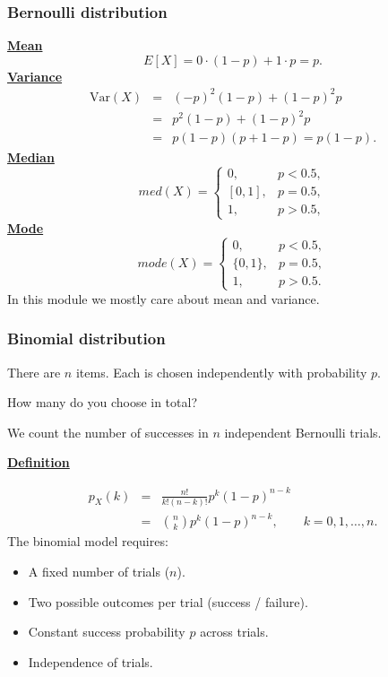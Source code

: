 \documentclass[t,8pt]{beamer}
\begin{document}
\begin{frame}
	\frametitle{Bernoulli distribution}
	{\bf\underline{Mean}}
	\[
	E[X]=0\cdot(1-p)+1\cdot p=p.
	\]
	{\bf\underline{Variance}}
	\begin{eqnarray*}
		\mathrm{Var}(X)
		&=&(-p)^2(1-p)+(1-p)^2p\\
		&=&p^2(1-p)+(1-p)^2p\\
		&=&p(1-p)(p+1-p)
		=p(1-p).
	\end{eqnarray*}
	{\bf\underline{Median}}
	\[
	{med}(X)=
	\left\{\begin{array}{ll}
		0, & p<0.5,\\
		\left[0,1\right], & p=0.5,\\
		1, & p>0.5,
	\end{array}\right.
	\]
	{\bf\underline{Mode}}
	\[
	{mode}(X)=
	\left\{\begin{array}{ll}
		0, & p<0.5,\\
		\{0,1\}, & p=0.5,\\
		1, & p>0.5.
	\end{array}\right.
	\]
	{\small\color{NavyBlue} In this module we mostly care about mean and variance.}
\end{frame}

\begin{frame}
	\frametitle{Binomial distribution}
	There are $n$ items. Each is chosen independently with probability $p$. \par
	How many do you choose in total? \par
	We count the number of successes in $n$ independent Bernoulli trials. \par
	{\bf\underline{Definition}} \par
	\begin{eqnarray*}
		p_X(k)
		&=&\frac{n!}{k!(n-k)!}p^k(1-p)^{n-k}\\
		&=&{n\choose k}p^k(1-p)^{n-k},\qquad k=0,1,\dots,n.
	\end{eqnarray*}
	The binomial model requires:
	\begin{itemize}
		\item A fixed number of trials ($n$).
		\item Two possible outcomes per trial (success / failure).
		\item Constant success probability $p$ across trials.
		\item Independence of trials.
	\end{itemize}
\end{frame}
\end{document}
